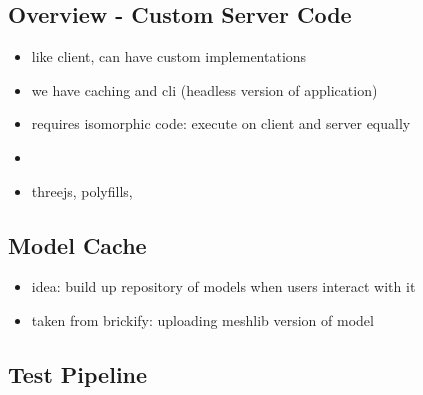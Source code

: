 \documentclass[../ClassicThesis.tex]{subfiles}
\begin{document}
\subsection{Overview - Custom Server Code}

\begin{itemize}
\item like client, can have custom implementations
\item we have caching and cli (headless version of application)
\item requires isomorphic code: execute on client and server equally
\item {}
\item threejs, polyfills, 
\end{itemize}

\subsection{Model Cache}

\begin{itemize}
\item idea: build up repository of models when users interact with it
\item taken from brickify: uploading meshlib version of model
\end{itemize}

\subsection{Test Pipeline}
\end{document}

